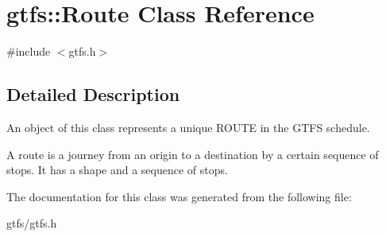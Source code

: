 \hypertarget{classgtfs_1_1Route}{}\section{gtfs\+:\+:Route Class Reference}
\label{classgtfs_1_1Route}


{\ttfamily \#include $<$gtfs.\+h$>$}



\subsection{Detailed Description}
An object of this class represents a unique R\+O\+U\+TE in the G\+T\+FS schedule.

A route is a journey from an origin to a destination by a certain sequence of stops. It has a shape and a sequence of stops. 

The documentation for this class was generated from the following file\+:\begin{DoxyCompactItemize}
\item 
gtfs/gtfs.\+h\end{DoxyCompactItemize}
